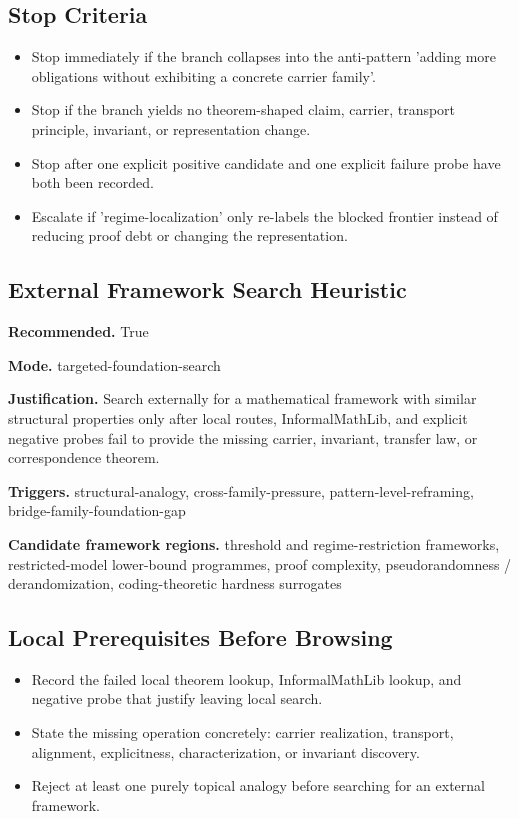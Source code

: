 \documentclass[11pt]{article}
\begin{document}
\subsection*{Stop Criteria}
\begin{itemize}[leftmargin=*,itemsep=0.2em]
\item Stop immediately if the branch collapses into the anti-pattern 'adding more obligations without exhibiting a concrete carrier family'.
\item Stop if the branch yields no theorem-shaped claim, carrier, transport principle, invariant, or representation change.
\item Stop after one explicit positive candidate and one explicit failure probe have both been recorded.
\item Escalate if 'regime-localization' only re-labels the blocked frontier instead of reducing proof debt or changing the representation.
\end{itemize}
\subsection*{External Framework Search Heuristic}
\textbf{Recommended.} True

\textbf{Mode.} targeted-foundation-search

\textbf{Justification.} Search externally for a mathematical framework with similar structural properties only after local routes, InformalMathLib, and explicit negative probes fail to provide the missing carrier, invariant, transfer law, or correspondence theorem.

\textbf{Triggers.} structural-analogy, cross-family-pressure, pattern-level-reframing, bridge-family-foundation-gap

\textbf{Candidate framework regions.} threshold and regime-restriction frameworks, restricted-model lower-bound programmes, proof complexity, pseudorandomness / derandomization, coding-theoretic hardness surrogates

\subsection*{Local Prerequisites Before Browsing}
\begin{itemize}[leftmargin=*,itemsep=0.2em]
\item Record the failed local theorem lookup, InformalMathLib lookup, and negative probe that justify leaving local search.
\item State the missing operation concretely: carrier realization, transport, alignment, explicitness, characterization, or invariant discovery.
\item Reject at least one purely topical analogy before searching for an external framework.
\end{itemize}
\end{document}
